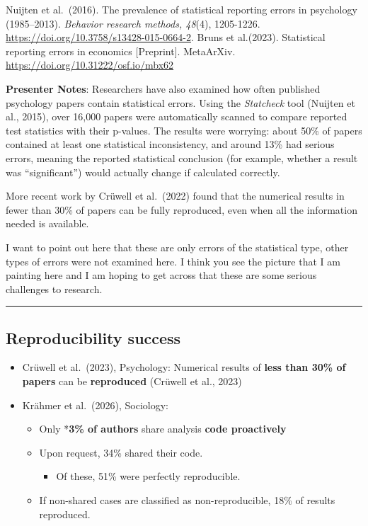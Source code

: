 \documentclass[
  english,
  letterpaper,
  DIV=11,
  numbers=noendperiod]{scrartcl}
\providecommand{\tightlist}{%
  \setlength{\itemsep}{0pt}\setlength{\parskip}{0pt}}
\begin{document}
Nuijten et al.~(2016). The prevalence of statistical reporting errors in
psychology (1985--2013). \emph{Behavior research methods, 48}(4),
1205-1226. \url{https://doi.org/10.3758/s13428-015-0664-2}. Bruns et
al.(2023). Statistical reporting errors in economics {[}Preprint{]}.
MetaArXiv. \url{https://doi.org/10.31222/osf.io/mbx62}

\textbf{Presenter Notes}: Researchers have also examined how often
published psychology papers contain statistical errors. Using the
\emph{Statcheck} tool (Nuijten et al., 2015), over 16,000 papers were
automatically scanned to compare reported test statistics with their
p-values. The results were worrying: about 50\% of papers contained at
least one statistical inconsistency, and around 13\% had serious errors,
meaning the reported statistical conclusion (for example, whether a
result was ``significant'') would actually change if calculated
correctly.

More recent work by Crüwell et al.~(2022) found that the numerical
results in fewer than 30\% of papers can be fully reproduced, even when
all the information needed is available.

I want to point out here that these are only errors of the statistical
type, other types of errors were not examined here. I think you see the
picture that I am painting here and I am hoping to get across that these
are some serious challenges to research.

\begin{center}\rule{0.5\linewidth}{0.5pt}\end{center}

\subsection{Reproducibility success}\label{reproducibility-success}

\begin{itemize}
\tightlist
\item
  Crüwell et al.~(2023), Psychology: Numerical results of \textbf{less
  than 30\% of papers} can be \textbf{reproduced} (Crüwell et al., 2023)
\item
  Krähmer et al.~(2026), Sociology:

  \begin{itemize}
  \tightlist
  \item
    Only *\textbf{3\% of authors} share analysis \textbf{code
    proactively}
  \item
    Upon request, 34\% shared their code.

    \begin{itemize}
    \tightlist
    \item
      Of these, 51\% were perfectly reproducible.
    \end{itemize}
  \item
    If non-shared cases are classified as non-reproducible, 18\% of
    results reproduced.
  \end{itemize}
\end{itemize}
\end{document}
